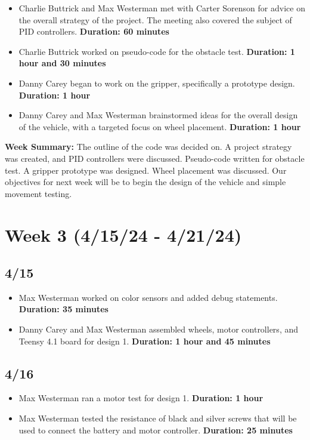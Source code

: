 \documentclass[11pt]{report}
\begin{document}
\begin{itemize}
    \item Charlie Buttrick and Max Westerman met with Carter Sorenson for advice on the overall strategy of the project. The meeting also covered the subject of \gls{PID} controllers. \textbf{Duration: 60 minutes}
    \item Charlie Buttrick worked on pseudo-code for the obstacle test. \textbf{Duration: 1 hour and 30 minutes}
    \item Danny Carey began to work on the gripper, specifically a prototype design. \textbf{Duration: 1 hour}
    \item Danny Carey and Max Westerman brainstormed ideas for the overall design of the vehicle, with a targeted focus on wheel placement. \textbf{Duration: 1 hour}
\end{itemize}

\textbf{Week Summary:} The outline of the code was decided on. A project strategy was created, and \gls{PID} controllers were discussed. Pseudo-code written for obstacle test. A gripper prototype was designed. Wheel placement was discussed. Our objectives for next week will be to begin the design of the vehicle and simple movement testing.

\section{Week 3 (4/15/24 - 4/21/24)}
\subsection*{4/15}

\begin{itemize}
    \item Max Westerman worked on color sensors and added debug statements. \textbf{Duration: 35 minutes}
    \item Danny Carey and Max Westerman assembled wheels, motor controllers, and Teensy 4.1 board for design 1. \textbf{Duration: 1 hour and 45 minutes}
\end{itemize}

\subsection*{4/16}

\begin{itemize}
    \item Max Westerman ran a motor test for design 1. \textbf{Duration: 1 hour}
    \item Max Westerman tested the resistance of black and silver screws that will be used to connect the battery and motor controller. \textbf{Duration: 25 minutes}
\end{itemize}
\end{document}
